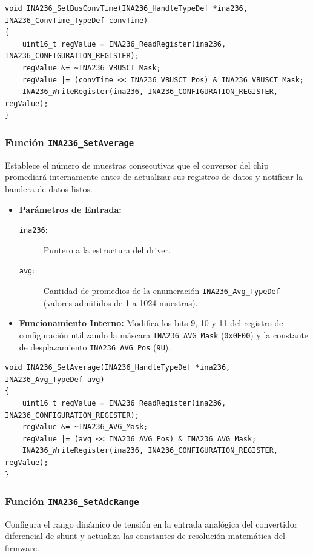 \documentclass[
10pt, %
a4paper, %
oneside, %
headinclude,footinclude, %
BCOR5mm, %
]{scrartcl}
\begin{document}
\begin{lstlisting}[style=CMakeStyle]
void INA236_SetBusConvTime(INA236_HandleTypeDef *ina236, INA236_ConvTime_TypeDef convTime)
{
    uint16_t regValue = INA236_ReadRegister(ina236, INA236_CONFIGURATION_REGISTER);
    regValue &= ~INA236_VBUSCT_Mask;
    regValue |= (convTime << INA236_VBUSCT_Pos) & INA236_VBUSCT_Mask;
    INA236_WriteRegister(ina236, INA236_CONFIGURATION_REGISTER, regValue);
}
\end{lstlisting}

\subsubsection{Función \texttt{INA236\_SetAverage}}
Establece el número de muestras consecutivas que el conversor del chip promediará internamente antes de actualizar sus registros de datos y notificar la bandera de datos listos.

\begin{itemize}
	\item \textbf{Parámetros de Entrada:}
		\begin{description}
			\item[\texttt{ina236}:] Puntero a la estructura del driver.
			\item[\texttt{avg}:] Cantidad de promedios de la enumeración \texttt{INA236\_Avg\_TypeDef} (valores admitidos de 1 a 1024 muestras).
		\end{description}
	\item \textbf{Funcionamiento Interno:}
		Modifica los bits 9, 10 y 11 del registro de configuración utilizando la máscara \texttt{INA236\_AVG\_Mask} (\texttt{0x0E00}) y la constante de desplazamiento \texttt{INA236\_AVG\_Pos} (\texttt{9U}).
\end{itemize}

\begin{lstlisting}[style=CMakeStyle]
void INA236_SetAverage(INA236_HandleTypeDef *ina236, INA236_Avg_TypeDef avg)
{
    uint16_t regValue = INA236_ReadRegister(ina236, INA236_CONFIGURATION_REGISTER);
    regValue &= ~INA236_AVG_Mask;
    regValue |= (avg << INA236_AVG_Pos) & INA236_AVG_Mask;
    INA236_WriteRegister(ina236, INA236_CONFIGURATION_REGISTER, regValue);
}
\end{lstlisting}

\subsubsection{Función \texttt{INA236\_SetAdcRange}}
Configura el rango dinámico de tensión en la entrada analógica del convertidor diferencial de shunt y actualiza las constantes de resolución matemática del firmware.
\end{document}
